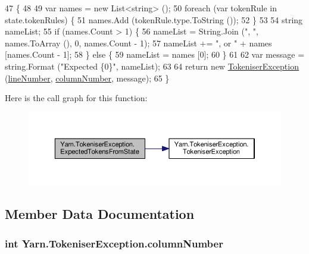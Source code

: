 \begin{DoxyCode}
47                                                                                                            
                       \{
48 
49             var names = \textcolor{keyword}{new} List<string> ();
50             \textcolor{keywordflow}{foreach} (var tokenRule \textcolor{keywordflow}{in} state.tokenRules) \{
51                 names.Add (tokenRule.type.ToString ());
52             \}
53 
54             \textcolor{keywordtype}{string} nameList;
55             \textcolor{keywordflow}{if} (names.Count > 1) \{
56                 nameList = String.Join (\textcolor{stringliteral}{", "}, names.ToArray (), 0, names.Count - 1);
57                 nameList += \textcolor{stringliteral}{", or "} + names [names.Count - 1];
58             \} \textcolor{keywordflow}{else} \{
59                 nameList = names [0];
60             \}
61 
62             var message = string.Format (\textcolor{stringliteral}{"Expected \{0\}"}, nameList);
63 
64             \textcolor{keywordflow}{return} \textcolor{keyword}{new} \hyperlink{a00164_ad00fcf742d2b0d476ce43b27a3f3b6c1}{TokeniserException} (\hyperlink{a00164_a54b936d7b4f26f88a07a66c5fc1d1ad1}{lineNumber}, 
      \hyperlink{a00164_aabf2ad38f3984297c1daede9be55e3d6}{columnNumber}, message);
65         \}
\end{DoxyCode}


Here is the call graph for this function\-:
\nopagebreak
\begin{figure}[H]
\begin{center}
\leavevmode
\includegraphics[width=350pt]{a00164_af88cfa5eafdee355e1abb67e358497bd_cgraph}
\end{center}
\end{figure}




\subsection{Member Data Documentation}
\hypertarget{a00164_aabf2ad38f3984297c1daede9be55e3d6}{
\subsubsection[{column\-Number}]{\setlength{\rightskip}{0pt plus 5cm}int Yarn.\-Tokeniser\-Exception.\-column\-Number}}\label{a00164_aabf2ad38f3984297c1daede9be55e3d6}


